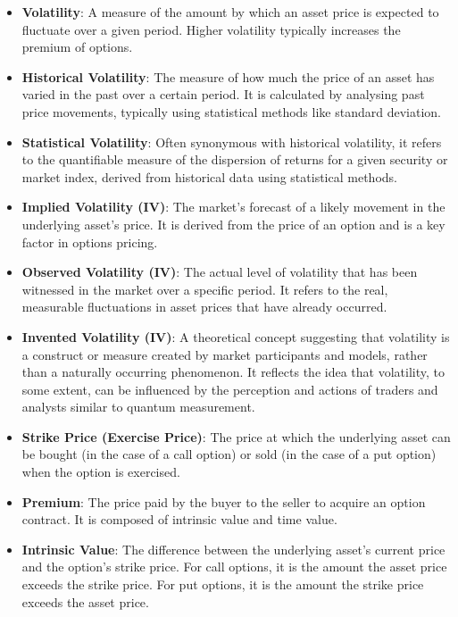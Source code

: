 \documentclass[12pt,a4paper]{report}
\numberwithin{equation}{section}
\begin{document}
\begin{itemize}
\item \textbf{Volatility}: A measure of the amount by which an asset price is
expected to fluctuate over a given period. Higher volatility typically
increases the premium of options.

\item \textbf{Historical Volatility}: The measure of how much the price of an asset
has varied in the past over a certain period. It is calculated by
analysing past price movements, typically using statistical methods like
standard deviation.

\item \textbf{Statistical Volatility}: Often synonymous with historical volatility,
it refers to the quantifiable measure of the dispersion of returns for a
given security or market index, derived from historical data using
statistical methods.

\item \textbf{Implied Volatility (IV)}: The market's forecast of a likely movement
in the underlying asset's price. It is derived from the price of an
option and is a key factor in options pricing.

\item \textbf{Observed Volatility (IV)}: The actual level of volatility that has
been witnessed in the market over a specific period. It refers to the
real, measurable fluctuations in asset prices that have already
occurred.

\item \textbf{Invented Volatility (IV)}: A theoretical concept suggesting that
volatility is a construct or measure created by market participants and
models, rather than a naturally occurring phenomenon. It reflects the
idea that volatility, to some extent, can be influenced by the
perception and actions of traders and analysts similar to quantum
measurement.

\item \textbf{Strike Price (Exercise Price)}: The price at which the underlying
asset can be bought (in the case of a call option) or sold (in the case
of a put option) when the option is exercised.

\item \textbf{Premium}: The price paid by the buyer to the seller to acquire an
option contract. It is composed of intrinsic value and time value.

\item \textbf{Intrinsic Value}: The difference between the underlying asset's
current price and the option's strike price. For call options, it is the
amount the asset price exceeds the strike price. For put options, it is the
amount the strike price exceeds the asset price.


\end{itemize}
\end{document}
